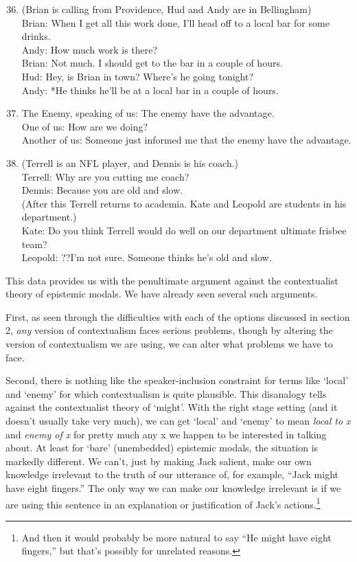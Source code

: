 \begin{enumerate}
\setcounter{enumi}{35} 
\item (Brian is calling from Providence, Hud and Andy are in 
Bellingham) \\
Brian: When I get all this work done, I'll head off to a local bar for some drinks. \\
Andy: How much work is there? \\
Brian: Not much. I should get to the bar in a couple of hours. \\
Hud: Hey, is Brian in town? Where's he going tonight? \\
Andy: *He thinks he'll be at a local bar in a couple of hours. \\
\item The Enemy, speaking of us: The enemy have the advantage. \\
One of us: How are we doing? \\
Another of us: Someone just informed me that the enemy have the advantage. \\
\item (Terrell is an NFL player, and Dennis is his coach.) \\
Terrell: Why are you cutting me coach? \\
Dennis: Because you are old and slow. \\
(After this Terrell returns to academia. Kate and Leopold are students in his department.) \\
Kate: Do you think Terrell would do well on our department ultimate frisbee team? \\
Leopold: ??I'm not sure. Someone thinks he's old and slow.
\end{enumerate}

\noindent This data provides us with the penultimate argument against the contextualist theory of epistemic modals. We have already seen several such arguments.
 
First, as seen through the difficulties with each of the options discussed in section 2, \textit{any} version of contextualism faces serious problems, though by altering the version of contextualism we are using, we can alter what problems we have to face.
 
Second, there is nothing like the speaker-inclusion constraint for terms like `local' and `enemy' for which contextualism is quite plausible. This disanalogy tells against the contextualist theory of `might'. With the right stage setting (and it doesn't usually take very much), we can get `local' and `enemy' to mean \textit{local to x} and \textit{enemy of x} for pretty much any x we happen to be interested in talking about. At least for `bare' (unembedded) epistemic modals, the situation is markedly different. We can't, just by making Jack salient, make our own knowledge irrelevant to the truth of our utterance of, for example, ``Jack might have eight fingers.'' The only way we can make our knowledge irrelevant is if we are using this sentence in an explanation or justification of Jack's actions.\footnote{And then it would probably be more natural to say ``He might have eight fingers,'' but that's possibly for unrelated reasons.} 
 
